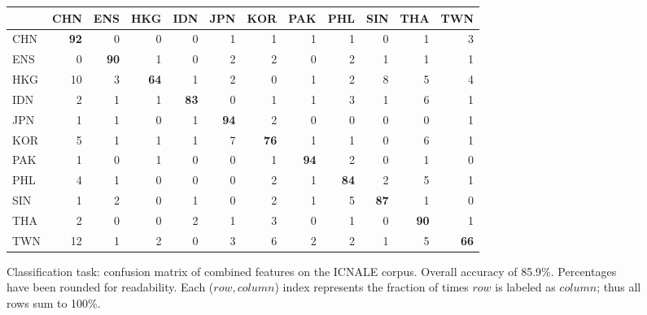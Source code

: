 \begin{figure*}[t]
\begin{center}
    \begin{tabular}{|l|rrrrrrrrrrr|}
    \hline
         &  CHN  &    ENS &     HKG  &    IDN  &    JPN  &    KOR  &    PAK  & PHL    & SIN    & THA   &  TWN \\
    \hline
    CHN & \textbf{92}    & 0  & 0     & 0    & 1   & 1    & 1     & 1 & 0 & 1 & 3 \\
    ENS & 0     & \textbf{90}    & 1     & 0    & 2     & 2    & 0     & 2    & 1    & 1    & 1 \\
    HKG & 10    & 3     & \textbf{64}    & 1    & 2     & 0    & 1     & 2    & 8    & 5    & 4 \\
    IDN & 2     & 1   & 1   & \textbf{83} & 0     & 1  & 1     & 3  & 1  & 6  & 1 \\
    JPN & 1     & 1   & 0     & 1  & \textbf{94}  & 2 & 0     & 0    & 0 & 0  & 1 \\
    KOR & 5  & 1     & 1  & 1    & 7  & \textbf{76}   & 1  & 1 & 0    & 6    & 1 \\
    PAK & 1   & 0   & 1     & 0    & 0     & 1    & \textbf{94}  & 2  & 0    & 1    & 0 \\
    PHL & 4   & 1     & 0     & 0    & 0     & 2    & 1   & \textbf{84}   & 2  & 5    & 1 \\
    SIN & 1     & 2     & 0   & 1  & 0   & 2  & 1     & 5  & \textbf{87}   & 1    & 0 \\
    THA & 2  & 0  & 0     & 2    & 1  & 3  & 0  & 1  & 0 & \textbf{90}   & 1 \\
    TWN & 12  & 1   & 2   & 0  & 3     & 6    & 2     & 2  & 1    & 5    & \textbf{66} \\
    \hline
    \end{tabular}
    \caption{Classification task: confusion matrix of combined features on the
        ICNALE corpus. Overall accuracy of 85.9\%. Percentages have been rounded
        for readability. Each ($row,column$) index represents the fraction of
        times $row$ is labeled as $column$; thus all rows sum to 100\%.}
    \label{fig-matrix}
\end{center}
\end{figure*}
